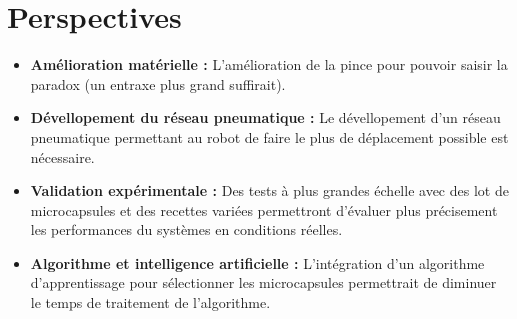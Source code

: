 \section{Perspectives}
\begin{itemize}
    \item \textbf{Amélioration matérielle :} L'amélioration de la pince pour pouvoir saisir la \gls{paradox} (un entraxe plus grand suffirait).
    \item \textbf{Dévellopement du réseau pneumatique :} Le dévellopement d'un réseau pneumatique permettant au robot de faire le plus de déplacement possible est nécessaire.
    \item \textbf{Validation expérimentale :} Des tests à plus grandes échelle avec des lot de \glspl{microcapsule} et des recettes variées permettront d'évaluer plus précisement les performances du systèmes en conditions réelles.
    \item \textbf{Algorithme et intelligence artificielle :} L'intégration d'un algorithme d'apprentissage pour sélectionner les \glspl{microcapsule} permettrait de diminuer le temps de traitement de l'algorithme.
\end{itemize}